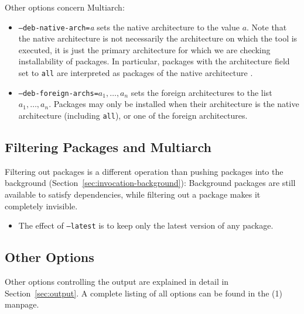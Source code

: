 Other options concern Multiarch:
\begin{itemize}
\item \texttt{--deb-native-arch=}\textit{a} sets the native
  architecture to the value $a$. Note that the native architecture is
  not necessarily the architecture on which the tool is executed, it
  is just the primary architecture for which we are checking
  installability of packages. In particular, packages with the
  architecture field set to \texttt{all} are interpreted as packages of the
  native architecture \cite{ubuntu:multiarch}.
\item \texttt{--deb-foreign-archs=}$a_1,\ldots,a_n$ sets the foreign
  architectures to the list $a_1,\ldots,a_n$. Packages may only be installed
  when their architecture is the native architecture (including \texttt{all}),
  or one of the foreign architectures.
\end{itemize}


\subsection{Filtering Packages and Multiarch}
Filtering out packages is a different operation than pushing packages
into the background (Section~\ref{sec:invocation-background}): Background
packages are still available to satisfy dependencies, while filtering out a 
package makes it completely invisible.

\begin{itemize}
\item The effect of \texttt{--latest} is to keep only the latest version of any
package.
\end{itemize}


\subsection{Other Options}
Other options controlling the output are explained in detail in
Section~\ref{sec:output}. A complete listing of all options can be found in
the \debcheck(1) manpage.


